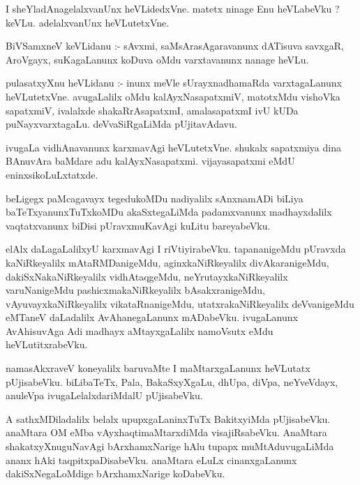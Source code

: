 \documentclass{article}
\begin{document}
\begin{mn}
I  sheYladAnagelalxvanUnx  heVLidedxVne.  matetx  ninage  Enu  heVLabeVku ?  keVLu.  
adelalxvanUnx  heVLutetxVne.
\end{mn}

\begin{mn}
BiVSamxneV  keVLidanu :- sAvxmi,  saMsArasAgaravanunx  dATisuva  savxgaR, AroVgayx,  
suKagaLanunx  koDuva  oMdu  varxtavanunx  nanage  heVLu.
\end{mn}

\begin{mn}
pulasatxyXnu  heVLidanu :- inunx  meVle  sUrayxnadhamaRda  varxtagaLanunx  heVLutetxVne.  
avugaLalilx  oMdu  kalAyxNasapatxmiV,  matotxMdu  vishoVka  sapatxmiV,  ivalalxde  
shakaRrAsapatxmI,  amalasapatxmI  ivU  kUDa  puNayxvarxtagaLu.  deVvaSiRgaLiMda  pUjitavAdavu.
\end{mn}

\begin{mn}
ivugaLa  vidhAnavanunx  karxmavAgi  heVLutetxVne.  shukalx  sapatxmiya  dina  BAnuvAra  
baMdare  adu  kalAyxNasapatxmi.  vijayasapatxmi  eMdU  eninxsikoLuLxtatxde.
\end{mn}

\begin{mn}
beLigegx  paMcagavayx  tegedukoMDu  nadiyalilx  sAnxnamADi  biLiya  baTeTxyanunxTuTxkoMDu  
akaSxtegaLiMda  padamxvanunx  madhayxdalilx  vaqtatxvanunx  biDisi  pUravxmuKavAgi  kuLitu  bareyabeVku.
\end{mn}

\begin{mn}
elAlx  daLagaLalilxyU  karxmavAgi  I  riVtiyirabeVku.  tapananigeMdu  pUravxda  kaNiRkeyalilx  
mAtaRMDanigeMdu,  aginxkaNiRkeyalilx  divAkaranigeMdu,  dakiSxNakaNiRkeyalilx  vidhAtaqgeMdu,  
neYrutayxkaNiRkeyalilx  varuNanigeMdu  pashicxmakaNiRkeyalilx  bAsakxranigeMdu,  vAyuvayxkaNiRkeyalilx  
vikataRnanigeMdu,  utatxrakaNiRkeyalilx  deVvanigeMdu  eMTaneV  daLadalilx  AvAhanegaLanunx  mADabeVku.  
ivugaLanunx  AvAhisuvAga  Adi  madhayx  aMtayxgaLalilx  namoVsutx  eMdu  heVLutitxrabeVku.
\end{mn}

\begin{mn}
namasAkxraveV  koneyalilx  baruvaMte  I  maMtarxgaLanunx  heVLutatx  pUjisabeVku.  biLibaTeTx,  
Pala,  BakaSxyXgaLu,  dhUpa,  diVpa,  neYveVdayx,  anuleVpa  ivugaLelalxdariMdalU  pUjisabeVku.
\end{mn}

\begin{mn}
A  sathxMDiladalilx  belalx  upupxgaLaninxTuTx  BakitxyiMda  pUjisabeVku.  anaMtara  OM  eMba  vAyxhaqtimaMtarxdiMda  
visajiRsabeVku.  AnaMtara  shakatxyXnuguNavAgi  bArxhamxNarige  hAlu  tupapx  muMtAduvugaLiMda  ananx  hAki  
taqpitxpaDisabeVku.  anaMtara  eLuLx  cinanxgaLanunx  dakiSxNegaLoMdige  bArxhamxNarige  koDabeVku.
\end{mn}
\end{document}
